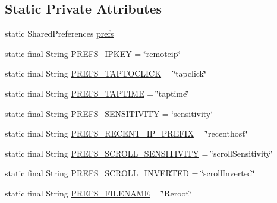 \subsection*{\-Static \-Private \-Attributes}
\begin{DoxyCompactItemize}
\item 
static \-Shared\-Preferences \hyperlink{classcom_1_1_cyberpad_1_1_reroot_1_1_settings_a3a54c0721f873c2ddf5de4eac53fbe24}{prefs}
\item 
static final \-String \hyperlink{classcom_1_1_cyberpad_1_1_reroot_1_1_settings_a84f5b5b8f8e85d445a891e84cb3e2a31}{\-P\-R\-E\-F\-S\-\_\-\-I\-P\-K\-E\-Y} = \char`\"{}remoteip\char`\"{}
\item 
static final \-String \hyperlink{classcom_1_1_cyberpad_1_1_reroot_1_1_settings_a34430b1c71d7ccf7fec0edf1cc648fd4}{\-P\-R\-E\-F\-S\-\_\-\-T\-A\-P\-T\-O\-C\-L\-I\-C\-K} = \char`\"{}tapclick\char`\"{}
\item 
static final \-String \hyperlink{classcom_1_1_cyberpad_1_1_reroot_1_1_settings_a979ec1791f057e8a6a4fcb8ef66b2dc7}{\-P\-R\-E\-F\-S\-\_\-\-T\-A\-P\-T\-I\-M\-E} = \char`\"{}taptime\char`\"{}
\item 
static final \-String \hyperlink{classcom_1_1_cyberpad_1_1_reroot_1_1_settings_a1925472996322349cc51e8c88adb4e8b}{\-P\-R\-E\-F\-S\-\_\-\-S\-E\-N\-S\-I\-T\-I\-V\-I\-T\-Y} = \char`\"{}sensitivity\char`\"{}
\item 
static final \-String \hyperlink{classcom_1_1_cyberpad_1_1_reroot_1_1_settings_af3267f6d72ef11ada8a3aac78d0eb0f8}{\-P\-R\-E\-F\-S\-\_\-\-R\-E\-C\-E\-N\-T\-\_\-\-I\-P\-\_\-\-P\-R\-E\-F\-I\-X} = \char`\"{}recenthost\char`\"{}
\item 
static final \-String \hyperlink{classcom_1_1_cyberpad_1_1_reroot_1_1_settings_aae0a1b587500ef504b6451b18153a8ce}{\-P\-R\-E\-F\-S\-\_\-\-S\-C\-R\-O\-L\-L\-\_\-\-S\-E\-N\-S\-I\-T\-I\-V\-I\-T\-Y} = \char`\"{}scroll\-Sensitivity\char`\"{}
\item 
static final \-String \hyperlink{classcom_1_1_cyberpad_1_1_reroot_1_1_settings_a4b5790c5a26ed464a159cf8688226b0d}{\-P\-R\-E\-F\-S\-\_\-\-S\-C\-R\-O\-L\-L\-\_\-\-I\-N\-V\-E\-R\-T\-E\-D} = \char`\"{}scroll\-Inverted\char`\"{}
\item 
static final \-String \hyperlink{classcom_1_1_cyberpad_1_1_reroot_1_1_settings_a8ee3df7158c2f7c5bdf8eba8de5fcfa0}{\-P\-R\-E\-F\-S\-\_\-\-F\-I\-L\-E\-N\-A\-M\-E} = \char`\"{}\-Reroot\char`\"{}
\end{DoxyCompactItemize}


